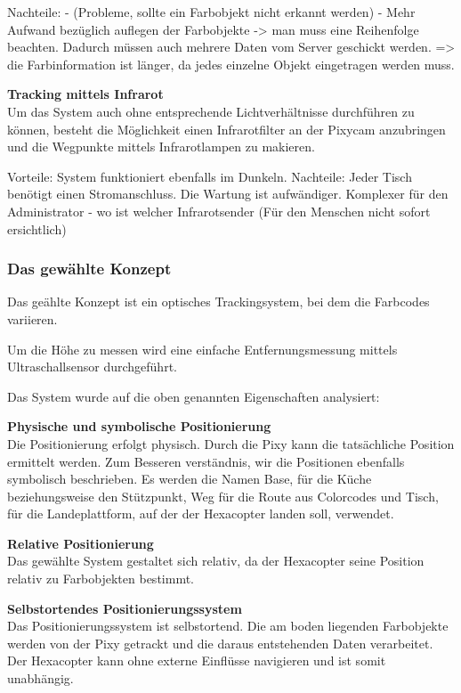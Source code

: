  Nachteile:
  - (Probleme, sollte ein Farbobjekt nicht erkannt werden)
  - Mehr Aufwand bezüglich auflegen der Farbobjekte -> man muss eine Reihenfolge beachten. Dadurch müssen auch mehrere Daten vom Server geschickt werden. => die Farbinformation ist länger, da jedes einzelne Objekt eingetragen werden muss.



  \textbf{Tracking mittels Infrarot}\\
  Um das System auch ohne entsprechende Lichtverhältnisse durchführen zu können, besteht die Möglichkeit einen Infrarotfilter an der Pixycam anzubringen und die Wegpunkte mittels Infrarotlampen zu makieren.

  Vorteile:
  System funktioniert ebenfalls im Dunkeln.
  Nachteile:
  Jeder Tisch benötigt einen Stromanschluss.
  Die Wartung ist aufwändiger.
  Komplexer für den Administrator - wo ist welcher Infrarotsender (Für den Menschen nicht sofort ersichtlich)


  \subsubsection{Das gewählte Konzept}

  Das geählte Konzept ist ein optisches Trackingsystem, bei dem die Farbcodes variieren.

  Um die Höhe zu messen wird eine einfache Entfernungsmessung mittels Ultraschallsensor durchgeführt.

  Das System wurde auf die oben genannten Eigenschaften analysiert:

  \textbf{Physische und symbolische Positionierung}\\
  Die Positionierung erfolgt physisch. Durch die Pixy kann die tatsächliche Position ermittelt werden.
  Zum Besseren verständnis, wir die Positionen ebenfalls symbolisch beschrieben. Es werden die Namen Base, für die Küche beziehungsweise den Stützpunkt, Weg für die Route aus Colorcodes und Tisch, für die Landeplattform, auf der der Hexacopter landen soll, verwendet.

  \textbf{Relative Positionierung}\\
  Das gewählte System gestaltet sich relativ, da der Hexacopter seine Position relativ zu Farbobjekten bestimmt.

  \textbf{Selbstortendes Positionierungssystem}\\
  Das Positionierungssystem ist selbstortend. Die am boden liegenden Farbobjekte werden von der Pixy getrackt und die daraus entstehenden Daten verarbeitet. Der Hexacopter kann ohne externe Einflüsse navigieren und ist somit unabhängig.

